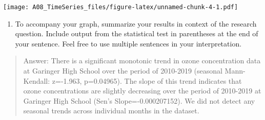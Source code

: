 \documentclass[]{article}
\providecommand{\tightlist}{%
  \setlength{\itemsep}{0pt}\setlength{\parskip}{0pt}}
\begin{document}
\texttt{[image: A08\_TimeSeries\_files/figure-latex/unnamed-chunk-4-1.pdf]}

\begin{enumerate}
\def\labelenumi{\arabic{enumi}.}
\setcounter{enumi}{13}
\tightlist
\item
  To accompany your graph, summarize your results in context of the
  research question. Include output from the statistical test in
  parentheses at the end of your sentence. Feel free to use multiple
  sentences in your interpretation.
\end{enumerate}

\begin{quote}
Answer: There is a significant monotonic trend in ozone concentration
data at Garinger High School over the period of 2010-2019 (seasonal
Mann-Kendall: z=-1.963, p=0.04965). The slope of this trend indicates
that ozone concentrations are slightly decreasing over the period of
2010-2019 at Garinger High School (Sen's Slope=-0.000207152). We did not
detect any seasonal trends across individual months in the dataset.
\end{quote}
\end{document}
